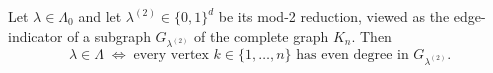 \begin{lemma}
\label{lem:even-degree}
Let $\lambda \in \Lambda_0$ and let $\lambda^{(2)} \in \{0,1\}^d$ be its
mod-2 reduction, viewed as the edge-indicator of a subgraph
$G_{\lambda^{(2)}}$ of the complete graph $K_n$. Then
\[
  \lambda \in \Lambda
  \;\Longleftrightarrow\;
  \text{every vertex } k \in \{1,\dots,n\} \text{ has even degree in }
  G_{\lambda^{(2)}}.
\]
\end{lemma}

